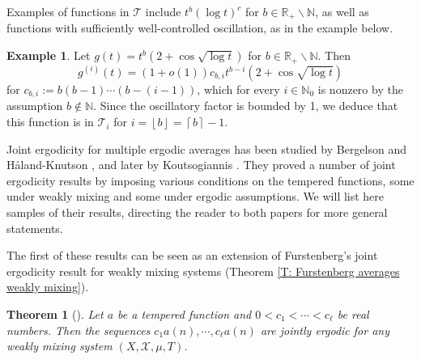\documentclass[11pt]{amsart}
\newtheorem{theorem}[lemma]{Theorem}
\theoremstyle{definition}
\newtheorem{example}[lemma]{Example}
\let\ringaccent\r
\def\aa{\ringaccent a}
\def\aa{\ringaccent a}
\newcommand{\N}{{\mathbb N}}
\newcommand{\R}{{\mathbb R}}
\newcommand{\CP}{{\mathcal P}}
\newcommand{\CT}{{\mathcal T}}
\newcommand{\CX}{{\mathcal X}}
\renewcommand{\r}{{\mathbf{r}}}
\newcommand{\1}{{\mathbf{1}}}
\newcommand{\floor}[1]{{\left \lfloor #1 \right \rfloor}}
\newcommand{\ceil}[1]{{\left \lceil #1 \right \rceil}}
\newcommand{\rem}[1]{\left \{ #1 \right \}}
\newcommand{\BK}[1]{{\color{Apricot}{{#1}}}}
\begin{document}
Examples of functions in $\CT$ include $t^b (\log t)^c$ for $b\in\R_+\backslash\N$, %
as well as functions with sufficiently well-controlled oscillation, as in the example below.
\begin{example}
Let $g(t) = t^b(2 + \cos\sqrt{\log t})$ for $b\in\R_+\backslash\N$. Then $$g^{(i)}(t) =(1+o(1))c_{b,i} t^{b-i}(2 + \cos\sqrt{\log t})$$
for $c_{b,i}:=b(b-1)\cdots(b - (i-1))$, which for every $i\in\N_0$ is nonzero by the assumption $b\notin\N$.
Since the oscillatory factor is bounded by 1, we deduce that this function is in $\CT_i$ for $i = \floor{b}= \ceil{b}-1$.
\end{example}


Joint ergodicity for multiple ergodic averages has been studied by Bergelson and H{\aa}land-Knutson \cite{BeHK09}, and later by Koutsogiannis \cite{Kouts21}. They proved a number of joint ergodicity results by imposing various conditions on the tempered functions, some under weakly mixing and some under ergodic assumptions. We will list here samples of their results, directing the reader to both papers for more general statements.

The first of these results can be seen as an extension of Furstenberg's joint ergodicity result for weakly mixing systems (Theorem \ref{T: Furstenberg averages weakly mixing}).
\begin{theorem}[{\cite[Corollary 5.14(i)]{BeHK09}}]
    Let $a$ be a tempered function and $0<c_1<\cdots <c_\ell$ be real numbers. Then the sequences $c_1 a(n), \cdots, c_\ell a(n)$ are jointly ergodic for any weakly mixing system $(X, \CX, \mu, T)$.
\end{theorem}
\end{document}
